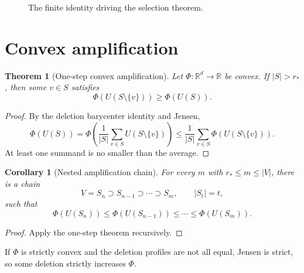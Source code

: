 \documentclass[11pt]{article}
\newtheorem{theorem}{Theorem}
\newtheorem{corollary}{Corollary}
\newcommand{\R}{\mathbb R}
\begin{document}
\begin{figure}[ht]
\centering
{}
\caption{The finite identity driving the selection theorem.}
\end{figure}

\section{Convex amplification}
\begin{theorem}[One-step convex amplification]
Let $\Phi:\R^d\to\R$ be convex. If $|S|>r_*$, then some $v\in S$ satisfies
\[
\Phi(U(S\setminus\{v\}))\ge \Phi(U(S)).
\]
\end{theorem}

\begin{proof}
By the deletion barycenter identity and Jensen,
\[
\Phi(U(S))
=\Phi\left(\frac1{|S|}\sum_{v\in S}U(S\setminus\{v\})\right)
\le \frac1{|S|}\sum_{v\in S}\Phi(U(S\setminus\{v\})).
\]
At least one summand is no smaller than the average.
\end{proof}

\begin{corollary}[Nested amplification chain]
For every $m$ with $r_*\le m\le|V|$, there is a chain
\[
V=S_n\supset S_{n-1}\supset\cdots\supset S_m,
\qquad |S_t|=t,
\]
such that
\[
\Phi(U(S_n))\le\Phi(U(S_{n-1}))\le\cdots\le\Phi(U(S_m)).
\]
\end{corollary}

\begin{proof}
Apply the one-step theorem recursively.
\end{proof}

If $\Phi$ is strictly convex and the deletion profiles are not all equal, Jensen is strict, so some deletion strictly increases $\Phi$.
\end{document}
